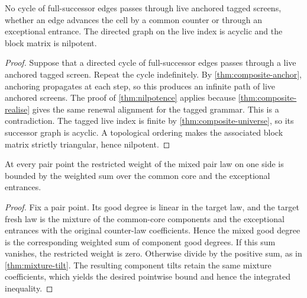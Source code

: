 \begin{theorem}
\label{thm:composite-acyclic}
\leanok
No cycle of full-successor edges passes through live anchored tagged screens, whether an edge
advances the cell by a common counter or through an exceptional entrance. The directed graph on
the live index is acyclic and the block matrix is nilpotent.
\end{theorem}

\begin{proof}
\leanok
{}
Suppose that a directed cycle of full-successor edges passes through a live anchored tagged screen.
Repeat the cycle indefinitely. By \cref{thm:composite-anchor}, anchoring propagates at each step,
so this produces an infinite path of live anchored screens. The proof of
\cref{thm:nilpotence} applies because \cref{thm:composite-realise} gives the same renewal
alignment for the tagged grammar. This is a contradiction. The tagged live index is finite by
\cref{thm:composite-universe}, so its successor graph is acyclic. A topological ordering makes
the associated block matrix strictly triangular, hence nilpotent.
\end{proof}

\begin{lemma}
\label{thm:mixture-tilt-composite}
\leanok
{}
At every pair point the restricted weight of the mixed pair law on one side is bounded by the
weighted sum over the common core and the exceptional entrances.
\end{lemma}

\begin{proof}
\leanok
{}
Fix a pair point. Its good degree is linear in the target law, and the target fresh law is the
mixture of the common-core components and the exceptional entrances with the original counter-law
coefficients. Hence the mixed good degree is the corresponding weighted sum of component good
degrees. If this sum vanishes, the restricted weight is zero. Otherwise divide by the positive
sum, as in \cref{thm:mixture-tilt}. The resulting component tilts retain the same mixture
coefficients, which yields the desired pointwise bound and hence the integrated inequality.
\end{proof}

